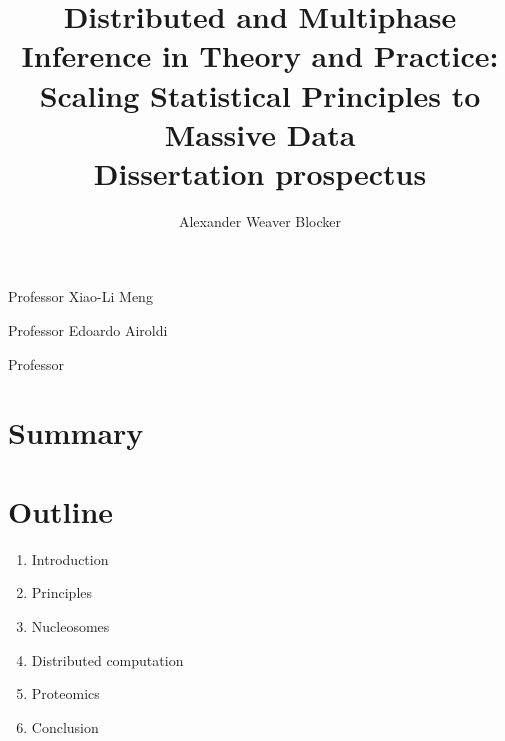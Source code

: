 \documentclass[12pt,letter]{article}
\begin{document}
\title{Distributed and Multiphase Inference in Theory and Practice: Scaling Statistical Principles to Massive Data \\ \large Dissertation prospectus}

\author{Alexander Weaver Blocker}
\date{}
\maketitle

{\fontsize{16}{20}\selectfont

Professor Xiao-Li Meng \hfill \makebox[3in]{\hrulefill}

\vspace{40pt}

Professor Edoardo Airoldi \hfill \makebox[3in]{\hrulefill}

\vspace{40pt}

Professor \hfill \makebox[3in]{\hrulefill}
}

\clearpage

\section*{Summary}



\clearpage

\section*{Outline}

\begin{enumerate}
\item Introduction
\item Principles
\item Nucleosomes
\item Distributed computation
\item Proteomics
\item Conclusion
\end{enumerate}
\end{document}
